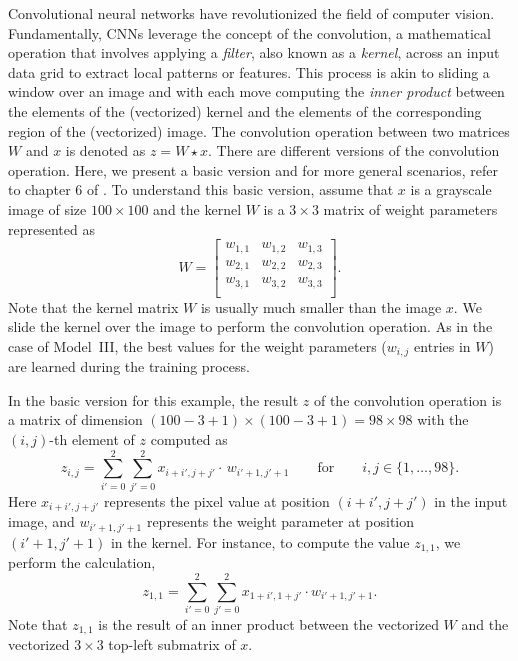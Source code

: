 \documentclass[12pt]{article}
\begin{document}
Convolutional neural networks have revolutionized the field of computer vision. Fundamentally, CNNs leverage the concept of the convolution, a mathematical operation that involves applying a {\em filter}, also known as a {\em kernel}, across an input data grid to extract local patterns or features. This process is akin to sliding a window over an image and with each move computing the {\em inner product} between the elements of the (vectorized) kernel and the elements of the corresponding region of the (vectorized) image. The convolution operation between two matrices $W$ and $x$ is denoted as $z = W \star x$. There are different versions of the convolution operation. Here, we present a basic version and for more general scenarios, refer to chapter 6 of  \cite{LiquetMokaNazarathy2024DeepLearning}. To understand this basic version, assume that $x$ is a grayscale image of size $100 \times 100$ and the kernel $W$ is a $3\times 3$ matrix of weight parameters represented as
%
\begin{equation}
\label{eq:conv-kernel}
W = 
\begin{bmatrix}
    w_{1,1} & w_{1,2} & w_{1,3} \\
    w_{2,1} & w_{2,2} & w_{2,3} \\
    w_{3,1} & w_{3,2} & w_{3,3} \\
\end{bmatrix}.
\end{equation}
%
Note that the kernel matrix $W$ is usually much smaller than the image $x$. We slide the kernel over the image to perform the convolution operation. As in the case of Model~III, the best values for the weight parameters ($w_{i, j}$ entries in $W$) are learned during the training process. 

In the basic version for this example, the result $z$ of the convolution operation is a matrix of dimension $(100 - 3 + 1) \times (100 - 3 + 1) = 98 \times 98$ with the $(i, j)$-th element of $z$ computed as 
%
\begin{equation}
\label{eq:conv-explicit}
z_{i,j} = \sum_{i'=0}^{2} \sum_{j'=0}^{2} x_{i+i', j+j'}  \cdot \, w_{i'+1, j'+1}
\qquad
\textrm{for}
\qquad i, j \in \{1, \dots, 98\}.
\end{equation}
%
Here \( x_{i+i', j+j'} \) represents the pixel value at position \( (i+i', j+j') \) in the input image, and \( w_{i'+1, j'+1} \) represents the weight parameter at position \( (i'+1, j'+1) \) in the kernel. For instance, to compute the value $z_{1, 1}$,%
we perform the calculation,
%
\begin{equation}
\label{eq:very-spcific-conv}
z_{1,1} = \sum_{i'=0}^{2} \sum_{j'=0}^{2} x_{1+i', 1+j'} \cdot w_{i'+1, j'+1}.
\end{equation}
%
Note that $z_{1,1}$ is the result of an inner product between the vectorized $W$ and the vectorized $3\times 3$ top-left submatrix of $x$. 
\end{document}
